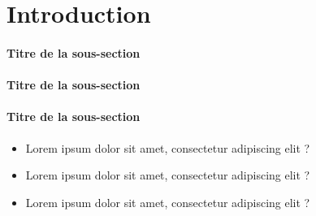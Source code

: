 \chapter*{Introduction} %


\lipsum[66]


\subsubsection*{Titre de la sous-section}

\lipsum[66]

\lipsum[70]


\subsubsection*{Titre de la sous-section}

\lipsum[70]


\subsubsection*{Titre de la sous-section}

\lipsum[66]

\begin{itemize}
    \item Lorem ipsum dolor sit amet, consectetur adipiscing elit ? \cite{Faulkes2021}
    \item Lorem ipsum dolor sit amet, consectetur adipiscing elit ? 
    \item Lorem ipsum dolor sit amet, consectetur adipiscing elit ?
\end{itemize}

\lipsum[70]

\lipsum[70]

\lipsum[70]

\lipsum[70]
